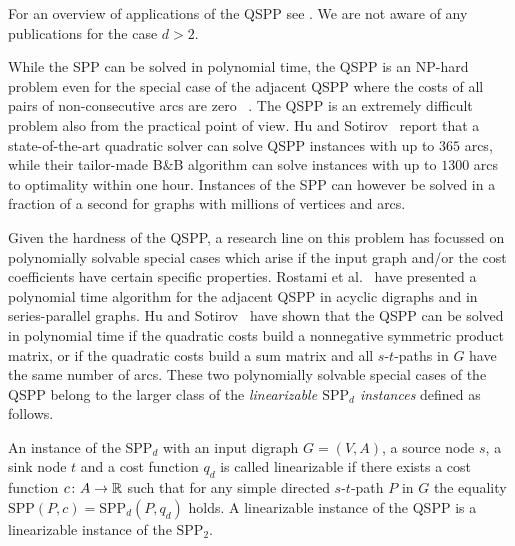 For an overview of applications of the QSPP see \cite{huSo2020,rostami2018}.
We are not  aware of any
publications  
for the case $d>2$.


While the SPP can be solved in polynomial time, the QSPP is an NP-hard
problem even for the special case of the adjacent QSPP where  the  costs of all pairs of non-consecutive  arcs are  
zero ~\cite{rostami2018}.
The QSPP is  an  extremely difficult
problem also from the practical point of view.  
 Hu and Sotirov~\cite{huSo2020} report that a state-of-the-art quadratic solver can
solve QSPP instances with up to $365$ arcs, while their  tailor-made B\&B
algorithm can solve instances with up to $1300$ arcs to optimality within one  hour. 
Instances of the SPP can however be solved in a fraction of a second for graphs with
millions of vertices and arcs.

\smallskip

Given the 
hardness of the QSPP, a research line on this problem has focussed
on 
polynomially solvable special cases which
arise if the input graph and/or the cost coefficients have certain specific
properties. Rostami et al.~\cite{rostami2015} have presented a polynomial time
algorithm for the adjacent QSPP in acyclic digraphs and in series-parallel graphs. Hu 
and Sotirov~\cite{huSo2018}
have shown that the QSPP can be solved in polynomial time if the  quadratic
costs build a  nonnegative symmetric product matrix, or if the quadratic costs
build a sum matrix and all $s$-$t$-paths in 
$G$ have the same number of arcs. 
These two polynomially solvable
special cases of the QSPP belong to the larger class of the \emph{linearizable $\text{SPP}_d$ instances} defined as follows.
\begin{definition}
\label{def:linearizable}
 An instance of the SPP$_d$ with an input digraph $G=(V,A)$, a source node $s$, a sink node $t$
 and a  cost function $q_d$ is called linearizable if there exists a cost function
 $c\colon A\to \mathbb{R}$ such that for any simple directed $s$-$t$-path  $P$ in $G$ the equality
 $\text{SPP}(P,c) = \text{SPP}_d(P,q_d)$ holds.
  A linearizable instance  of the  QSPP is a linearizable instance of the $\text{SPP}_2$.
\end{definition}

